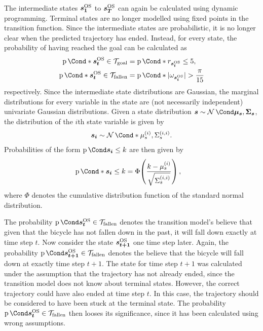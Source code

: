 The intermediate states $\bm{s_1}^{\text{OS}}$ to $\bm{s_T}^{\text{OS}}$ can again be calculated using dynamic programming.
Terminal states are no longer modelled using fixed points in the transition function.
Since the intermediate states are probabilistic, it is no longer clear when the predicted trajectory has ended.
Instead, for every state, the probability of having reached the goal can be calculated as
\begin{align}
    \Prob*{\os{\mat{s_t}} \in \Goal} &= \Prob*{r_{\os{\mat{s_t}}} \leq 5}, \\
    \Prob*{\os{\mat{s_t}} \in \Fallen} &= \Prob*{\abs{\omega_{\os{\mat{s_t}}}} > \frac{\pi}{15}}
\end{align}
respectively.
Since the intermediate state distributions are Gaussian, the marginal distributions for every variable in the state are (not necessarily independent) univariate Gaussian distributions.
Given a state distribution $\rv{s} \sim \Gaussian{\mat{\mu_s}, \mat{\Sigma_s}}$, the distribution of the $i$th state variable is given by
\begin{align}
    \rv{s_i} \sim \Gaussian*{\mu_{s}^{(i)}, \Sigma_{s}^{(i,i)}}.
\end{align}
Probabilities of the form $\Prob{\rv{s_i} \leq k}$ are then given by
\begin{align}
    \Prob*{\rv{s_i} \leq k} &= \Phi\!\left( \frac{k - \mu_s^{(i)}}{\sqrt{\Sigma_s^{(i,i)}}} \right),
\end{align}
where $\Phi$ denotes the cumulative distribution function of the standard normal distribution.

The probability $\Prob{\os{\mat{s_t}} \in \Fallen}$ denotes the transition model's believe that given that the bicycle has not fallen down in the past, it will fall down exactly at time step $t$.
Now consider the state $\bm{s_{t+1}}^{\text{OS}}$ one time step later.
Again, the probability $\Prob{\os{\mat{s_{t+1}}} \in \Fallen}$ denotes the believe that the bicycle will fall down at exactly time step $t+1$.
The state for time step $t+1$ was calculated under the assumption that the trajectory has not already ended, since the transition model does not know about terminal states.
However, the correct trajectory could have also ended at time step $t$.
In this case, the trajectory should be considered to have been stuck at the terminal state.
The probability $\Prob{\os{\mat{s_t}} \in \Fallen}$ then looses its significance, since it has been calculated using wrong assumptions.

